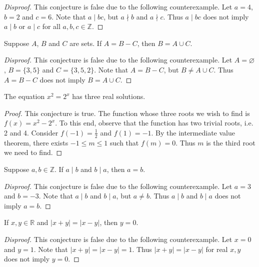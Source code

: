 \documentclass{exam}
\begin{document}
\begin{proof}[Disproof]
    This conjecture is false due to the following counterexample. Let $a = 4$, $b = 2$ and $c = 6$. Note that $a\mid bc$, but $a\nmid b$ and $a\nmid c$. Thus $a\mid bc$ does not imply $a\mid b$ or $a\mid c$ for all $a, b, c\in\mathbb Z$.
\end{proof}

\begin{conjecture}{9.26}
    Suppose $A$, $B$ and $C$ are sets. If $A=B-C$, then $B=A\cup C$.
\end{conjecture}

\begin{proof}[Disproof]
    This conjecture is false due to the following counterexample. Let $A=\varnothing$, $B=\{3, 5\}$ and $C=\{3, 5, 2\}$. Note that $A = B - C$, but $B\neq A\cup C$. Thus $A=B-C$ does not imply $B=A\cup C$.
\end{proof}

\begin{conjecture}{9.27}
    The equation $x^2 = 2^x$ has three real solutions.
\end{conjecture}

\begin{proof}
    This conjecture is true. The function whose three roots we wish to find is $f(x)=x^2-2^x$. To this end, observe that the function has two trivial roots, i.e. 2 and 4. Consider $f(-1) = \frac12$ and $f(1) = -1$. By the intermediate value theorem, there exists $-1\le m\le 1$ such that $f(m) = 0$. Thus $m$ is the third root we need to find.
\end{proof}

\begin{conjecture}{9.28}
    Suppose $a,b\in\mathbb Z$. If $a\mid b$ and $b\mid a$, then $a = b$.
\end{conjecture}

\begin{proof}[Disproof]
    This conjecture is false due to the following counterexample. Let $a =3$ and $b = -3$. Note that $a\mid b$ and $b\mid a$, but $a\neq b$. Thus $a\mid b$ and $b\mid a$ does not imply $a = b$.
\end{proof}

\begin{conjecture}{9.29}
    If $x,y\in\mathbb R$ and $\lvert x + y\rvert = \lvert x-y \rvert$, then $y = 0$.
\end{conjecture}

\begin{proof}[Disproof]
    This conjecture is false due to the following counterexample. Let $x = 0$ and $y = 1$. Note that $\lvert x + y\rvert = \lvert x-y \rvert = 1$. Thus $\lvert x + y\rvert = \lvert x-y \rvert$ for real $x, y$ does not imply $y=0$.
\end{proof}
\end{document}
